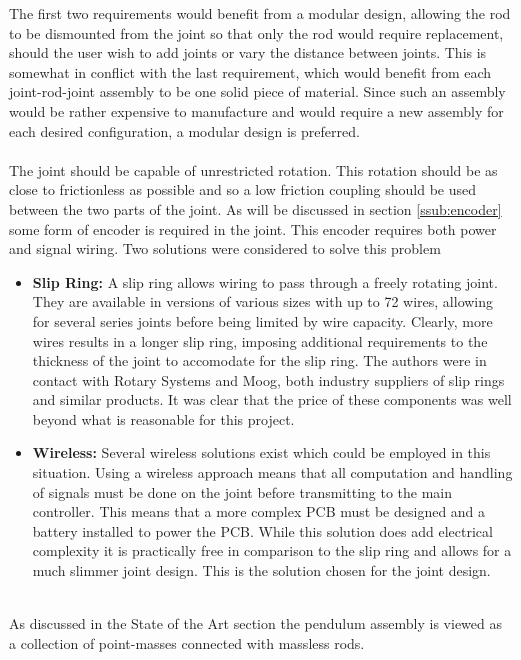 The first two requirements would benefit from a modular design, allowing the rod to be dismounted from the joint so that only the rod would require replacement, should the user wish to add joints or vary the distance between joints.
This is somewhat in conflict with the last requirement, which would benefit from each joint-rod-joint assembly to be one solid piece of material.
Since such an assembly would be rather expensive to manufacture and would require a new assembly for each desired configuration, a modular design is preferred.
\\~\\
The joint should be capable of unrestricted rotation.
This rotation should be as close to frictionless as possible and so a low friction coupling should be used between the two parts of the joint.
As will be discussed in section \ref{ssub:encoder} some form of encoder is required in the joint.
This encoder requires both power and signal wiring.
Two solutions were considered to solve this problem
\begin{itemize}
  	\item \textbf{Slip Ring:} A slip ring allows wiring to pass through a freely rotating joint.
  	They are available in versions of various sizes with up to 72 wires, allowing for several series joints before being limited by wire capacity.
  	Clearly, more wires results in a longer slip ring, imposing additional requirements to the thickness of the joint to accomodate for the slip ring.
  	The authors were in contact with Rotary Systems and Moog, both industry suppliers of slip rings and similar products.
  	It was clear that the price of these components was well beyond what is reasonable for this project.
  	\item \textbf{Wireless:} Several wireless solutions exist which could be employed in this situation.
  	Using a wireless approach means that all computation and handling of signals must be done on the joint before transmitting to the main controller.
  	This means that a more complex PCB must be designed and a battery installed to power the PCB.
  	While this solution does add electrical complexity it is practically free in comparison to the slip ring and allows for a much slimmer joint design.
  	This is the solution chosen for the joint design.
\end{itemize}
~\\
As discussed in the State of the Art section the pendulum assembly is viewed as a collection of point-masses connected with massless rods.
